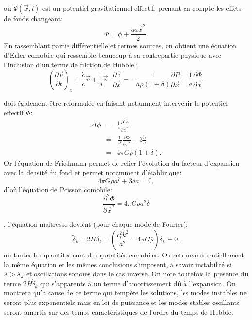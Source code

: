  où $\Phi(\vec x,t)$ est un potentiel gravitationnel effectif, prenant en compte les effets de fonds changeant:
 \begin{equation}
 \Phi= \phi+\frac{a\ddot a {\vec x}^2}{2}.
 \end{equation}
En rassemblant partie différentielle et termes sources, on obtient une équation d'Euler comobile qui ressemble beaucoup à sa contrepartie physique avec l'inclusion d'un terme de friction de Hubble :
\begin{equation}
\left(\frac{\partial \vec v}{\partial t}\right)_x +\frac{\dot a}{a}\vec v+\frac{1}{a}\vec v \cdot \frac{\partial \vec v}{\partial \vec x}=-\frac{1}{a\bar \rho (1+\delta)}\frac{\partial P}{\partial \vec x}-\frac{1}{a}\frac{\partial \Phi}{\partial \vec x}.
\end{equation}

 doit également être reformulée en faisant notamment intervenir le potentiel effectif $\Phi$:
\begin{eqnarray}
\Delta \phi &=&\frac{1}{a}\frac{\partial^2 \phi}{\partial \vec x^2}\\
&=&\frac{1}{a^2}\frac{\partial \Phi}{\partial \vec x^2}-3\frac{\ddot a}{a}\\
&=&4\pi G \bar \rho(1+\delta).
\end{eqnarray}
Or l'équation de Friedmann permet de relier l'évolution du facteur d'expansion avec la densité du fond et permet notamment d'établir que:
\begin{equation}
4\pi G \bar \rho a^2+3 a \ddot a=0,
\end{equation}
 d'où l'équation de Poisson comobile:
 \begin{equation}
 \frac{\partial^2 \Phi}{\partial \vec x^2}=4\pi G \bar \rho a^2 \delta
 \end{equation}
 
 , l'équation maîtresse devient (pour chaque mode de Fourier):
 \begin{equation}
  \ddot \delta_k +2H\dot \delta_k+ (\frac{c_s^2k ^2}{a^2}-4\pi G \bar \rho) \delta_k= 0.
  \label{e:epert}
 \end{equation}
 où toutes les quantités sont des quantités comobiles. On retrouve essentiellement la même équation et les mêmes conclusions s'imposent, à savoir instabilité si $\lambda >\lambda_J$ et oscillations sonores dans le cas inverse. On note toutefois la présence du terme $2H\dot \delta_k$ qui s'apparente à un terme d'amortissement dû à l'expansion. On montrera qu'a cause de ce terme qui tempère les solutions, les modes instables ne seront plus exponentiels mais en loi de puissance et les modes stables oscillants seront amortis sur des temps caractéristiques de l'ordre du temps de Hubble.
 

